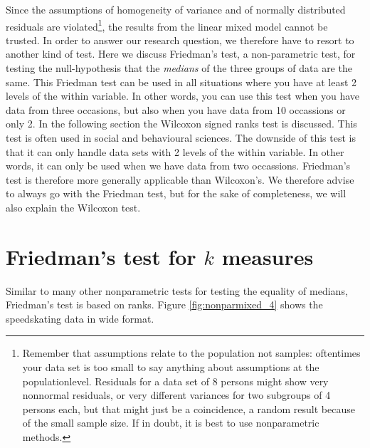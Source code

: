 \begin{knitrout}
\color{fgcolor}\begin{kframe}


{\ttfamily\noindent\bfseries{}}\end{kframe}
\end{knitrout}
Since the assumptions of homogeneity of variance and of normally distributed residuals are violated\footnote{Remember that assumptions relate to the population not samples: oftentimes your data set is too small to say anything about assumptions at the populationlevel. Residuals for a data set of 8 persons might show very nonnormal residuals, or very different variances for two subgroups of 4 persons each, but that might just be a coincidence, a random result because of the small sample size. If in doubt, it is best to use nonparametric methods.}, the results from the linear mixed model cannot be trusted. In order to answer our research question, we therefore have to resort to another kind of test. Here we discuss Friedman's test, a non-parametric test, for testing the null-hypothesis that the \textit{medians} of the three groups of data are the same. This Friedman test can be used in all situations where you have at least 2 levels of the within variable. In other words, you can use this test when you have data from three occasions, but also when you have data from 10 occassions or only 2. In the following section the Wilcoxon signed ranks test is discussed. This test is often used in social and behavioural sciences. The downside of this test is that it can only handle data sets with 2 levels of the within variable. In other words, it can only be used when we have data from two occassions. Friedman's test is therefore more generally applicable than Wilcoxon's. We therefore advise to always go with the Friedman test, but for the sake of completeness, we will also explain the Wilcoxon test.





\section{Friedman's test for $k$ measures}


Similar to many other nonparametric tests for testing the equality of medians, Friedman's test is based on ranks. Figure \ref{fig:nonparmixed_4} shows the speedskating data in wide format.


